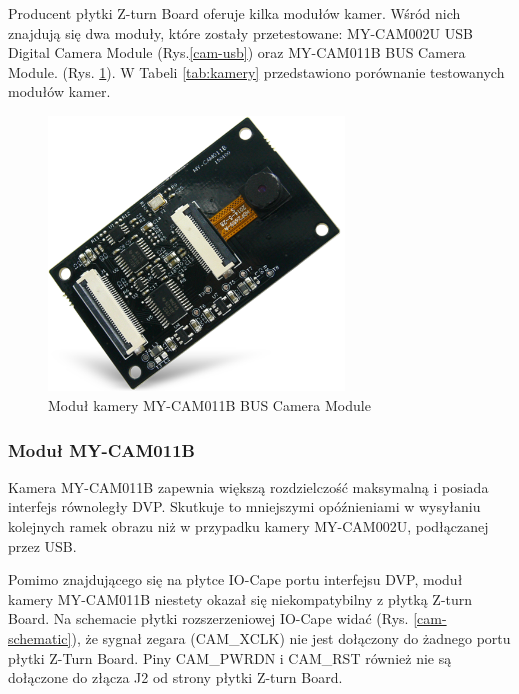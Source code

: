   Producent płytki Z-turn Board oferuje kilka modułów kamer. Wśród nich znajdują się dwa moduły, które zostały przetestowane: 
  MY-CAM002U USB Digital Camera Module (Rys.\ref{cam-usb}) oraz MY-CAM011B BUS Camera Module. (Rys. \ref{cam-dvp}). W Tabeli 
  \ref{tab:kamery} przedstawiono porównanie testowanych modułów kamer. 
  
  \begin{figure}[!h]
      \centering
      \includegraphics[width=0.7\textwidth]{img/my-cam011b.png}
      \caption{Moduł kamery MY-CAM011B BUS Camera Module \cite{cam-dvp-obraz}}
      \label{cam-dvp}
    \end{figure}

\subsubsection{Moduł MY-CAM011B}

Kamera MY-CAM011B zapewnia większą rozdzielczość maksymalną i posiada interfejs równoległy DVP. Skutkuje to mniejszymi 
opóźnieniami w wysyłaniu kolejnych ramek obrazu niż w przypadku kamery MY-CAM002U, podłączanej przez USB. 

Pomimo znajdującego się na płytce IO-Cape portu interfejsu DVP, moduł kamery MY-CAM011B niestety okazał się niekompatybilny z 
płytką Z-turn Board. Na schemacie płytki rozszerzeniowej IO-Cape widać (Rys. \ref{cam-schematic}), że sygnał zegara 
(CAM\_XCLK) nie jest dołączony do żadnego portu płytki Z-Turn Board. Piny CAM\_PWRDN i CAM\_RST również nie są dołączone do 
złącza J2 od strony płytki Z-turn Board. 


